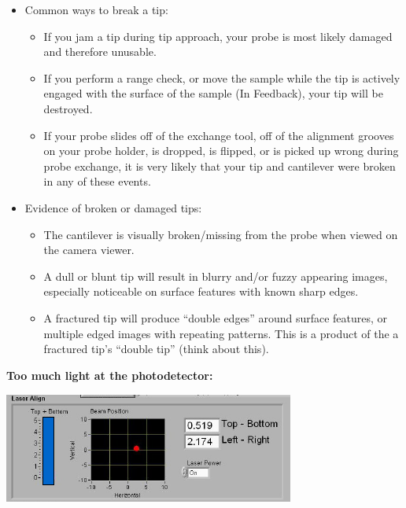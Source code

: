 \documentclass{../lab}
\begin{document}
\begin{itemize}
    \item Common ways to break a tip:

    \begin{itemize}
        \item If you jam a tip during tip approach, your probe is most likely damaged and therefore unusable.

        \item If you perform a range check, or move the sample while the tip is actively engaged with the surface of the sample (In Feedback), your tip will be destroyed.

        \item If your probe slides off of the exchange tool, off of the alignment grooves on your probe holder, is dropped, is flipped, or is picked up wrong during probe exchange, it is very likely that your tip and cantilever were broken in any of these events.

    \end{itemize}

    \item Evidence of broken or damaged tips:

    \begin{itemize}
        \item The cantilever is visually broken/missing from the probe when viewed on the camera viewer.

        \item A dull or blunt tip will result in blurry and/or fuzzy appearing images, especially noticeable on surface features with known sharp edges.

        \item A fractured tip will produce ``double edges'' around surface features, or multiple edged images with repeating patterns.  This is a product of the a fractured tip's ``double tip'' (think about this).

    \end{itemize}

\end{itemize}

\textbf{Too much light at the photodetector:}


\begin{center}
    \href{http://experimentationlab.berkeley.edu/sites/default/files/AFMImages/53.png}{\includegraphics[width=0.5\linewidth]{images/53.png}}
\end{center}
\end{document}
